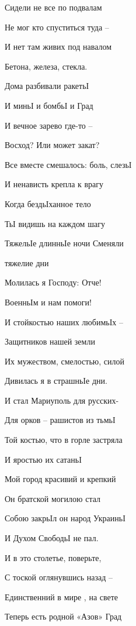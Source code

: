 \raggedcolumns
\begin{multicols}{2} %
\setlength{\parindent}{0pt}

Сидели не все по подвалам

Не мог кто спуститься туда – 

И нет там живих под навалом

Бетона, железа, стекла.

Дома разбивали ракетьІ

И миньІ и бомбьІ и Град

И вечное зарево где-то – 

Восход? Или может закат?

Все вместе смешалось: боль, слезьІ

И ненависть крепла к врагу

Когда бездьІханное тело

ТьІ видишь на каждом шагу

ТяжельІе длинньІе ночи Сменяли 

тяжелие дни

Молилась я Господу: Отче!

ВоенньІм и нам помоги!

И стойкостью наших любимьІх –

Защитников нашей земли

Их мужеством, смелостью, силой 

Дивилась я в страшньІе дни.

И стал Мариуполь для русских-

Для орков – рашистов из тьмьІ

Той костью, что в горле застряла

И яростью их сатаньІ

Мой город красивий и крепкий

Он братской могилою стал

Собою закрьІл он народ УкраиньІ

И Духом СвободьІ не пал.

И в это столетье, поверьте,

С тоской оглянувшись назад –

Единственний в мире , на свете

Теперь есть родной «Азов» Град
\end{multicols} %
